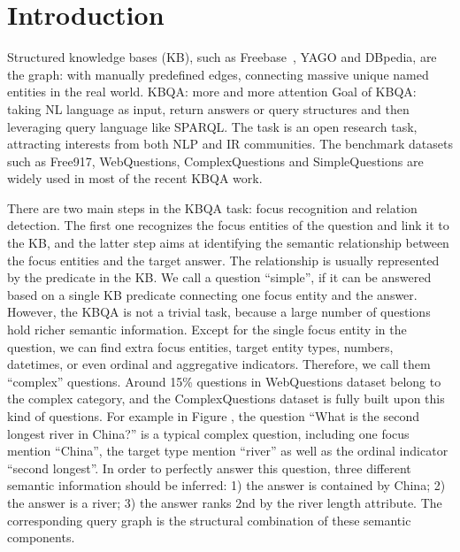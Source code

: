 \section{Introduction}




Structured knowledge bases (KB), such as Freebase~\cite{bollacker2008freebase}, YAGO and DBpedia,
are the graph: with manually predefined edges, connecting massive unique named entities in the real world.
KBQA: more and more attention
Goal of KBQA: taking NL language as input, return answers or query structures
and then leveraging query language like SPARQL.
The task is an open research task, attracting interests from both NLP and IR communities.
The benchmark datasets such as Free917, WebQuestions, ComplexQuestions and SimpleQuestions
are widely used in most of the recent KBQA work.

There are two main steps in the KBQA task: focus recognition and relation detection.
The first one recognizes the focus entities of the question and link it to the KB,
and the latter step aims at identifying the semantic relationship between the focus entities and the target answer.
The relationship is usually represented by the predicate in the KB.
We call a question ``simple'', if it can be answered based on a single KB predicate connecting
one focus entity and the answer.
However, the KBQA is not a trivial task, because a large number of questions
hold richer semantic information.
Except for the single focus entity in the question,
we can find extra focus entities, target entity types, numbers, datetimes,
or even ordinal and aggregative indicators.
Therefore, we call them ``complex'' questions.
Around 15\% questions in WebQuestions dataset belong to the complex category,
and the ComplexQuestions dataset is fully built upon this kind of questions.
For example in Figure ,
the question ``What is the second longest river in China?'' is a typical complex question,
including one focus mention ``China'', the target type mention ``river''
as well as the ordinal indicator ``second longest''.
In order to perfectly answer this question, three different semantic information should be inferred:
1) the answer is contained by China;
2) the answer is a river;
3) the answer ranks 2nd by the river length attribute.
The corresponding query graph is the structural combination of these semantic components.


